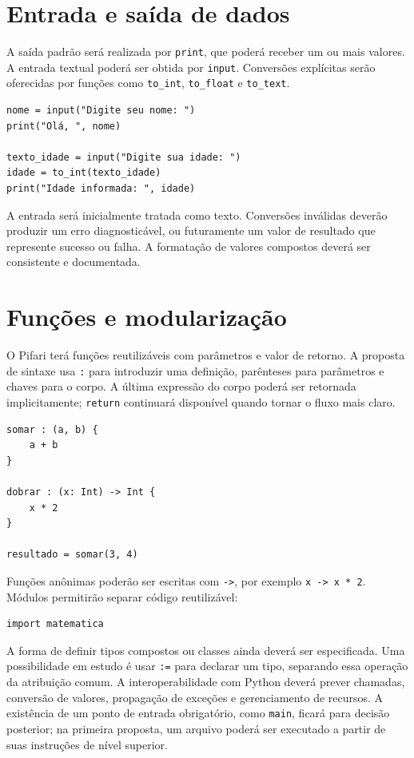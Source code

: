 \documentclass[12pt,a4paper]{article}
\begin{document}
\section{Entrada e saída de dados}
A saída padrão será realizada por \texttt{print}, que poderá receber um ou mais valores. A entrada textual poderá ser obtida por \texttt{input}. Conversões explícitas serão oferecidas por funções como \texttt{to\_int}, \texttt{to\_float} e \texttt{to\_text}.

\begin{lstlisting}
nome = input("Digite seu nome: ")
print("Olá, ", nome)

texto_idade = input("Digite sua idade: ")
idade = to_int(texto_idade)
print("Idade informada: ", idade)
\end{lstlisting}

A entrada será inicialmente tratada como texto. Conversões inválidas deverão produzir um erro diagnosticável, ou futuramente um valor de resultado que represente sucesso ou falha. A formatação de valores compostos deverá ser consistente e documentada.

\section{Funções e modularização}
O Pifari terá funções reutilizáveis com parâmetros e valor de retorno. A proposta de sintaxe usa \texttt{:} para introduzir uma definição, parênteses para parâmetros e chaves para o corpo. A última expressão do corpo poderá ser retornada implicitamente; \texttt{return} continuará disponível quando tornar o fluxo mais claro.

\begin{lstlisting}
somar : (a, b) {
    a + b
}

dobrar : (x: Int) -> Int {
    x * 2
}

resultado = somar(3, 4)
\end{lstlisting}

Funções anônimas poderão ser escritas com \texttt{->}, por exemplo \texttt{x -> x * 2}. Módulos permitirão separar código reutilizável:

\begin{lstlisting}
import matematica
\end{lstlisting}

A forma de definir tipos compostos ou classes ainda deverá ser especificada. Uma possibilidade em estudo é usar \texttt{:=} para declarar um tipo, separando essa operação da atribuição comum. A interoperabilidade com Python deverá prever chamadas, conversão de valores, propagação de exceções e gerenciamento de recursos. A existência de um ponto de entrada obrigatório, como \texttt{main}, ficará para decisão posterior; na primeira proposta, um arquivo poderá ser executado a partir de suas instruções de nível superior.
\end{document}
